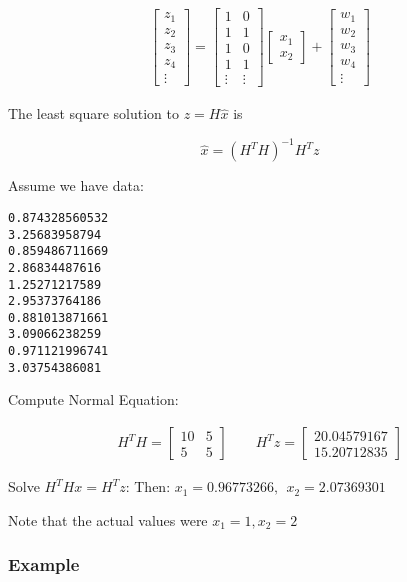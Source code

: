 \[\begin{aligned}
\begin{bmatrix}
 z_1 \\ z_2 \\ z_3 \\ z_4 \\ \vdots
\end{bmatrix}
=
\begin{bmatrix}
 1 & 0 \\
1 & 1  \\
1 & 0 \\
1 & 1  \\
\vdots & \vdots
\end{bmatrix}
\begin{bmatrix}
 x_1 \\ x_2
\end{bmatrix}
+
\begin{bmatrix}
 w_1 \\ w_2 \\ w_3 \\ w_4\\ \vdots
\end{bmatrix}
\end{aligned}\]

The least square solution to \(z = H\hat{x}\) is

\[\hat{x} = \left(H^TH\right)^{-1} H^T z\]

Assume we have data:

\begin{verbatim}
0.874328560532
3.25683958794
0.859486711669
2.86834487616
1.25271217589
2.95373764186
0.881013871661
3.09066238259
0.971121996741
3.03754386081
\end{verbatim}

Compute Normal Equation:

\[\begin{aligned}
H^T H =
\begin{bmatrix}
10 & 5 \\ 5 & 5
\end{bmatrix}
\quad \quad
H^Tz =
\begin{bmatrix}
 20.04579167  \\15.20712835
\end{bmatrix}
\end{aligned}\]

Solve \(H^T H x = H^Tz\): Then:
\(x_1 = 0.96773266, ~~ x_2=  2.07369301\)

Note that the actual values were \(x_1 = 1, x_2=  2\)

\hypertarget{example-2}{%
\subsubsection{Example}\label{example-2}}

